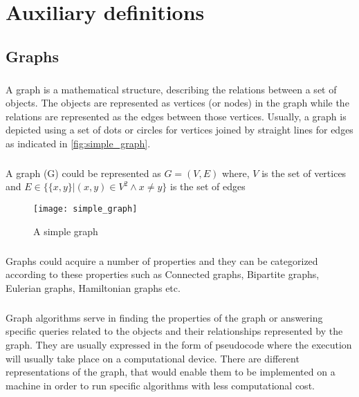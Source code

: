 \chapter{Auxiliary definitions}

\section{Graphs}

\paragraph{}
A graph is a mathematical structure, describing the relations between a set of objects. The objects are represented as vertices (or nodes) in the graph while the relations are represented as the edges between those vertices. Usually, a graph is depicted using a set of dots or circles for vertices joined by straight lines for edges as indicated in \autoref{fig:simple_graph}. 

\paragraph{}
A graph (G) could be represented as \(G = (V, E)\) where, \(V\) is the set of vertices and \(E \in \{\{x, y\} | (x, y) \in V^2 \wedge x \ne y\}\) is the set of edges

\begin{figure}[H]
    \centering \texttt{[image: simple\_graph]}
    \caption{A simple graph}
    \label{fig:simple_graph}
\end{figure}

\paragraph{}
Graphs could acquire a number of properties and they can be categorized according to these properties such as Connected graphs, Bipartite graphs, Eulerian graphs, Hamiltonian graphs etc. 

\paragraph{}
Graph algorithms serve in finding the properties of the graph or answering specific queries related to the objects and their relationships represented by the graph. They are usually expressed in the form of pseudocode where the execution will usually take place on a computational device. There are different representations of the graph, that would enable them to be implemented on a machine in order to run specific algorithms with less computational cost. 

